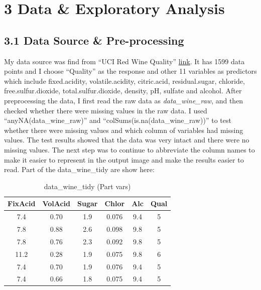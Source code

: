 \documentclass[
  doc,floatsintext]{apa6}
\begin{document}
\newpage

\section{3 Data \& Exploratory Analysis}\label{data-exploratory-analysis}

\subsection{3.1 Data Source \& Pre-processing}\label{data-source-pre-processing}

My data source was find from ``UCI Red Wine Quality'' \href{https://archive.ics.uci.edu/ml/machine-learning-databases/wine-quality/winequality-red.csv}{link}. It has 1599 data points and I choose ``Quality'' as the response and other 11 variables as predictors which include fixed.acidity, volatile.acidity, citric.acid, residual.sugar, chloride, free.sulfur.dioxide, total.sulfur.dioxide, density, pH, sulfate and alcohol.
After preprocessing the data, I first read the raw data as \emph{data\_wine\_raw}, and then checked whether there were missing values in the raw data. I used ``anyNA(data\_wine\_raw)'' and ``colSums(is.na(data\_wine\_raw))'' to test whether there were missing values and which column of variables had missing values. The test results showed that the data was very intact and there were no missing values. The next step was to continue to abbreviate the column names to make it easier to represent in the output image and make the results easier to read.
Part of the data\_wine\_tidy are show here:

\begin{table}[!h]
\centering
\caption{\label{tab:show-mini-table}data\_wine\_tidy (Part vars)}
\centering
\begin{tabular}[t]{c|c|c|c|c|c}
\hline
FixAcid & VolAcid & Sugar & Chlor & Alc & Qual\\
\hline
7.4 & 0.70 & 1.9 & 0.076 & 9.4 & 5\\
\hline
7.8 & 0.88 & 2.6 & 0.098 & 9.8 & 5\\
\hline
7.8 & 0.76 & 2.3 & 0.092 & 9.8 & 5\\
\hline
11.2 & 0.28 & 1.9 & 0.075 & 9.8 & 6\\
\hline
7.4 & 0.70 & 1.9 & 0.076 & 9.4 & 5\\
\hline
7.4 & 0.66 & 1.8 & 0.075 & 9.4 & 5\\
\hline
\end{tabular}
\end{table}
\end{document}

